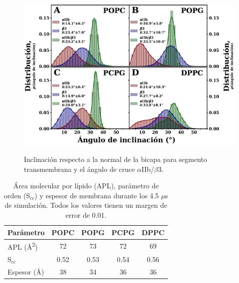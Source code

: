 \begin{figure}[H]
    \centering
	\includegraphics[width=1\linewidth, height=0.8\textheight, keepaspectratio]{fig/02_dm/angles.pdf} 
	\caption[Inclinación respecto a la normal de la bicapa para segmento transmembrana y el ángulo de cruce $\alpha$IIb/$\beta$3]{Inclinación respecto a la normal de la bicapa para segmento transmembrana y el ángulo de cruce $\alpha$IIb/$\beta$3.}
    \label{fig:angles}
\end{figure}




\begin{table}[h!]
  \begin{center}
  \begin{threeparttable}
\centering
    \caption{Área molecular por lípido (APL), parámetro de orden  (S\textbf{\LARGE{$_{cc}$}}) y espesor de membrana durante los 4.5 $\mu$s de simulación. Todos los valores tienen un margen de error de 0.01.}
    \label{tab:parame_lipid}
    \begin{tabular}{l| c c c c}
      \toprule %
		Parámetro 					&  POPC	& POPG 	& PCPG 	& DPPC \\ 
      \midrule %
		APL (Å\textsuperscript{2}) & 72 	& 73 	& 72 	& 69 \\ 

		S\textbf{\LARGE{$_{cc}$}} 					& 0.52 	& 0.53 	& 0.54	& 0.56 \\ 

		Espesor (Å) 					& 38 	& 34 	& 36 	& 36 \\ 
      \bottomrule %
    \end{tabular}
    \end{threeparttable}
  \end{center}
\end{table}

